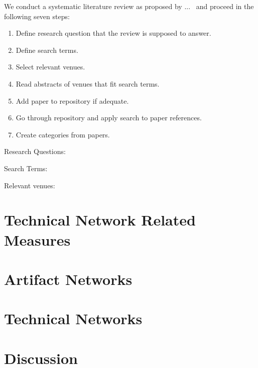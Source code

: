 We conduct a systematic literature review as proposed by ...~\cite{} and proceed in the following seven steps:

\begin{enumerate}
\item Define research question that the review is supposed to answer.
\item Define search terms.
\item Select relevant venues.
\item Read abstracts of venues that fit search terms.
\item Add paper to repository if adequate.
\item Go through repository and apply search to paper references.
\item Create categories from papers.
\end{enumerate}

Research Questions:

Search Terms:

Relevant venues:

\section{Technical Network Related Measures}
\label{chap:6:measure}
\section{Artifact Networks}
\label{chap:6:an}
\section{Technical Networks}
\label{chap:6:tn}
\section{Discussion}
\label{chap:6:dis}
